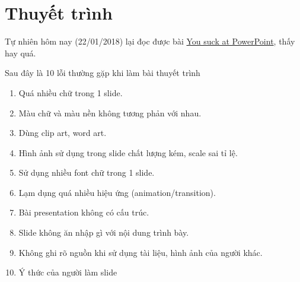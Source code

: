 \section{Thuyết trình}

Tự nhiên hôm nay (22/01/2018) lại đọc được bài \href{https://huynq.net/you-suck-at-powerpoint/}{You suck at PowerPoint}, thấy hay quá.

Sau đây là 10 lỗi thường gặp khi làm bài thuyết trình

\begin{enumerate}
  \item Quá nhiều chữ trong 1 slide.
  \item Màu chữ và màu nền không tương phản với nhau.
  \item Dùng clip art, word art.
  \item Hình ảnh sử dụng trong slide chất lượng kém, scale sai tỉ lệ.
  \item Sử dụng nhiều font chữ trong 1 slide.
  \item Lạm dụng quá nhiều hiệu ứng (animation/transition).
  \item Bài presentation không có cấu trúc.
  \item Slide không ăn nhập gì với nội dung trình bày.
  \item Không ghi rõ nguồn khi sử dụng tài liệu, hình ảnh của người khác.
  \item Ý thức của người làm slide
\end{enumerate}
